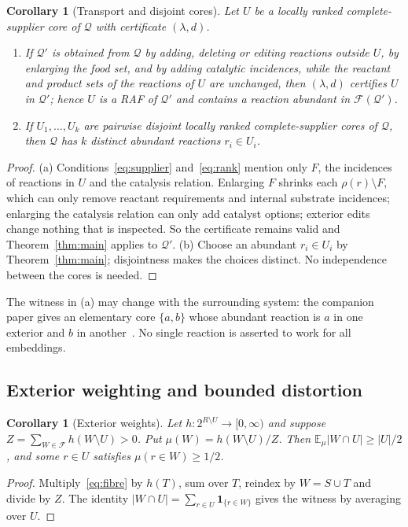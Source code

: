 \documentclass[11pt,a4paper]{article}
\theoremstyle{plain}
\newtheorem{corollary}[theorem]{Corollary}
\theoremstyle{definition}
\theoremstyle{remark}
\newcommand{\FF}{\mathcal F}
\newcommand{\QQ}{\mathcal Q}
\newcommand{\E}{\mathbb E}
\begin{document}
\begin{corollary}[Transport and disjoint cores]\label{cor:transport}
Let $U$ be a locally ranked complete-supplier core of $\QQ$ with certificate $(\lambda,d)$.
\begin{enumerate}[label=(\alph*)]
\item If $\QQ'$ is obtained from $\QQ$ by adding, deleting or editing reactions outside $U$, by enlarging the food set, and by adding catalytic incidences, while the reactant and product sets of the reactions of $U$ are unchanged, then $(\lambda,d)$ certifies $U$ in $\QQ'$; hence $U$ is a RAF of $\QQ'$ and contains a reaction abundant in $\FF(\QQ')$.
\item If $U_1,\dots,U_k$ are pairwise disjoint locally ranked complete-supplier cores of $\QQ$, then $\QQ$ has $k$ distinct abundant reactions $r_i\in U_i$.
\end{enumerate}
\end{corollary}
\begin{proof}
(a) Conditions~\eqref{eq:supplier} and~\eqref{eq:rank} mention only $F$, the incidences of reactions in $U$ and the catalysis relation. Enlarging $F$ shrinks each $\rho(r)\setminus F$, which can only remove reactant requirements and internal substrate incidences; enlarging the catalysis relation can only add catalyst options; exterior edits change nothing that is inspected. So the certificate remains valid and Theorem~\ref{thm:main} applies to $\QQ'$. (b) Choose an abundant $r_i\in U_i$ by Theorem~\ref{thm:main}; disjointness makes the choices distinct. No independence between the cores is needed.
\end{proof}

The witness in (a) may change with the surrounding system: the companion paper gives an elementary core $\{a,b\}$ whose abundant reaction is $a$ in one exterior and $b$ in another~\cite[Example~5.2]{elementary2026}. No single reaction is asserted to work for all embeddings.

\subsection{Exterior weighting and bounded distortion}

\begin{corollary}[Exterior weights]\label{cor:weights}
Let $h:2^{R\setminus U}\to[0,\infty)$ and suppose $Z=\sum_{W\in\FF}h(W\setminus U)>0$. Put $\mu(W)=h(W\setminus U)/Z$. Then $\E_\mu|W\cap U|\ge|U|/2$, and some $r\in U$ satisfies $\mu(r\in W)\ge1/2$.
\end{corollary}
\begin{proof}
Multiply~\eqref{eq:fibre} by $h(T)$, sum over $T$, reindex by $W=S\cup T$ and divide by $Z$. The identity $|W\cap U|=\sum_{r\in U}\mathbf1_{\{r\in W\}}$ gives the witness by averaging over $U$.
\end{proof}
\end{document}
